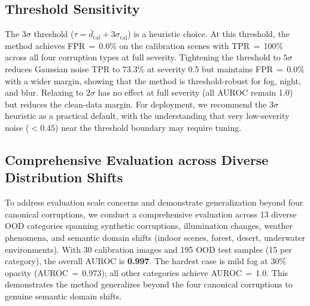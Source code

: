 \documentclass[11pt]{article}
\begin{document}
\subsection{Threshold Sensitivity}
\label{sec:threshold}

The $3\sigma$ threshold ($\tau = \bar{d}_\text{cal} + 3\sigma_\text{cal}$) is a heuristic choice.
At this threshold, the method achieves FPR\,$=$\,0.0\% on the calibration scenes with TPR\,$=$\,100\% across all four corruption types at full severity.
Tightening the threshold to $5\sigma$ reduces Gaussian noise TPR to 73.3\% at severity 0.5 but maintains FPR\,$=$\,0.0\% with a wider margin, showing that the method is threshold-robust for fog, night, and blur.
Relaxing to $2\sigma$ has no effect at full severity (all AUROC remain 1.0) but reduces the clean-data margin.
For deployment, we recommend the $3\sigma$ heuristic as a practical default, with the understanding that very low-severity noise ($< 0.45$) near the threshold boundary may require tuning.

\subsection{Comprehensive Evaluation across Diverse Distribution Shifts}
\label{sec:comprehensive}

To address evaluation scale concerns and demonstrate generalization beyond four canonical corruptions, we conduct a comprehensive evaluation across 13 diverse OOD categories spanning synthetic corruptions, illumination changes, weather phenomena, and semantic domain shifts (indoor scenes, forest, desert, underwater environments).
With 30 calibration images and 195 OOD test samples (15 per category), the overall AUROC is \textbf{0.997}.
The hardest case is mild fog at 30\% opacity (AUROC\,$=$\,0.973); all other categories achieve AUROC\,$=$\,1.0.
This demonstrates the method generalizes beyond the four canonical corruptions to genuine semantic domain shifts.
\end{document}
